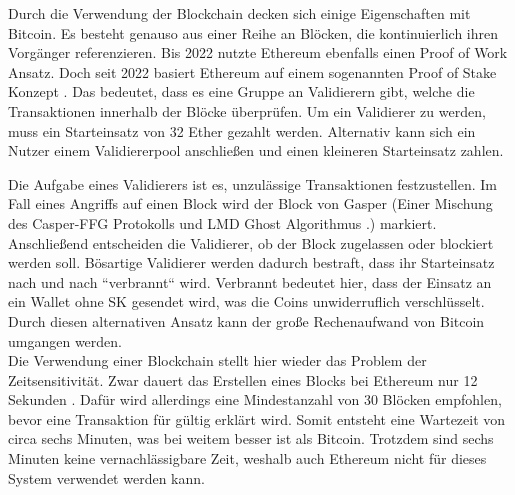\documentclass[
	fontsize=11pt,
	headings=small,
	parskip=half,           %
	bibliography=totoc,
	numbers=noenddot,       %
	open=any,               %
]{scrreprt}
\begin{document}
Durch die Verwendung der Blockchain decken sich einige Eigenschaften mit Bitcoin. Es besteht genauso aus einer Reihe an Blöcken, die kontinuierlich ihren Vorgänger referenzieren. Bis 2022 nutzte Ethereum ebenfalls einen Proof of Work Ansatz. Doch seit 2022 basiert Ethereum auf einem sogenannten Proof of Stake Konzept \cite{eth-explainerInvestopia}. Das bedeutet, dass es eine Gruppe an Validierern gibt, welche die Transaktionen innerhalb der Blöcke überprüfen. Um ein Validierer zu werden, muss ein Starteinsatz von 32 Ether gezahlt werden. Alternativ kann sich ein Nutzer einem Validiererpool anschließen und einen kleineren Starteinsatz zahlen.

Die Aufgabe eines Validierers ist es, unzulässige Transaktionen festzustellen. Im Fall eines Angriffs auf einen Block wird der Block von Gasper (Einer Mischung des Casper-FFG Protokolls und LMD Ghost Algorithmus \cite{eth-buterin2020combining}.) markiert. Anschließend entscheiden die Validierer, ob der Block zugelassen oder blockiert werden soll. Bösartige Validierer werden dadurch bestraft, dass ihr Starteinsatz nach und nach ``verbrannt`` wird. Verbrannt bedeutet hier, dass der Einsatz an ein Wallet ohne SK gesendet wird, was die Coins unwiderruflich verschlüsselt. Durch diesen alternativen Ansatz kann der große Rechenaufwand von Bitcoin umgangen werden.\\

Die Verwendung einer Blockchain stellt hier wieder das Problem der Zeitsensitivität. Zwar dauert das Erstellen eines Blocks bei Ethereum nur 12 Sekunden \cite{eth-timePerBlock}. Dafür wird allerdings eine Mindestanzahl von 30 Blöcken empfohlen, bevor eine Transaktion für gültig erklärt wird. Somit entsteht eine Wartezeit von circa sechs Minuten, was bei weitem besser ist als Bitcoin. Trotzdem sind sechs Minuten keine vernachlässigbare Zeit, weshalb auch Ethereum nicht für dieses System verwendet werden kann.
\end{document}
